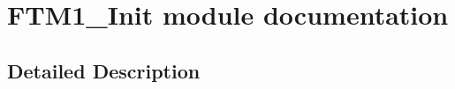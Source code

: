 \hypertarget{group___f_t_m1___init__module}{}\section{F\+T\+M1\+\_\+\+Init module documentation}
\label{group___f_t_m1___init__module}


\subsection{Detailed Description}
